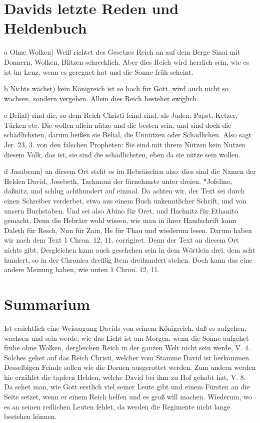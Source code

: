\section{Davids letzte Reden und Heldenbuch}

a Ohne Wolken) Weiß richtet des Gesetzes Reich an auf dem Berge Sinai mit Donnern, Wolken, Blitzen schrecklich. Aber dies Reich wird herrlich sein, wie es ist im Lenz, wenn es geregnet hat und die Sonne früh scheint.

b Nichts wächst) kein Königreich ist so hoch für Gott, wird auch nicht so wachsen, sondern vergehen. Allein dies Reich bestehet ewiglich.

c Belial) sind die, so dem Reich Christi feind sind, als Juden, Papst, Ketzer, Türken etc. Die wollen allein nütze und die besten sein, und sind doch die schädlichsten, darum heißen sie Belial, die Unnützen oder Schädlichen. Also sagt Jer. 23, 3. von den falschen Propheten: Sie sind mit ihrem Nützen kein Nutzen diesem Volk, das ist, sie sind die schädlichsten, eben da sie nütze sein wollen.

d Jasabeam) an diesem Ort steht es im Hebräischen also: dies sind die Namen der Helden David, Josebeth, Tachmoni der fürnehmste unter dreien. *Jofelino, daßnitz, und schlug achthundert auf einmal. Da achten wir, der Text sei durch einen Schreiber verderbet, etwa aus einem Buch unkenntlicher Schrift, und von unsern Buchstaben. Und sei also Abino für Oret, und Hachnitz für Ethanito gemacht. Denn die Hebräer wohl wissen, wie man in ihrer Handschrift kann Daleth für Resch, Nun für Zain, He für Thau und wiederum lesen. Darum haben wir nach dem Text 1 Chron. 12, 11. corrigiret. Denn der Text an diesem Ort nichts gibt. Dergleichen kann auch geschehen sein in dem Wörtlein drei, dem acht hundert, so in der Chronica dreißig Item dreihundert stehen. Doch kann das eine andere Meinung haben, wie unten 1 Chron. 12, 11.

\section{Summarium}

Ist ersichtlich eine Weissagung Davids von seinem Königreich, daß es aufgehen, wachsen und sein werde, wie das Licht ist am Morgen, wenn die Sonne aufgehet frühe ohne Wolken, dergleichen Reich in der ganzen Welt nicht sein werde, V. 4. Solches gehet auf das Reich Christi, welcher vom Stamme David ist herkommen. Desselbigen Feinde sollen wie die Dornen ausgerottet werden. Zum andern werden hie erzählet die tapfern Helden, welche David bei ihm zu Hof gehabt hat, V. 8. Da sehet man, wie Gott erstlich viel seiner Leute gibt und einem Fürsten an die Seite setzet, wenn er einem Reich helfen und es groß will machen. Wiederum, wo es an seinen redlichen Leuten fehlet, da werden die Regimente nicht lange bestehen können.

